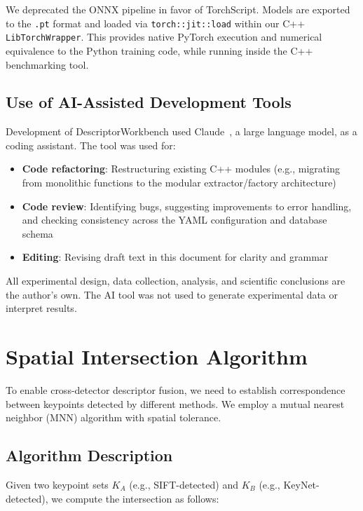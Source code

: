 We deprecated the ONNX pipeline in favor of TorchScript. Models are exported to the \texttt{.pt} format and loaded via \texttt{torch::jit::load} within our C++ \texttt{LibTorchWrapper}. This provides native PyTorch execution and numerical equivalence to the Python training code, while running inside the C++ benchmarking tool.

\subsection{Use of AI-Assisted Development Tools}

Development of DescriptorWorkbench used Claude~\cite{anthropic2025claude}, a large language model, as a coding assistant. The tool was used for:

\begin{itemize}
    \item \textbf{Code refactoring}: Restructuring existing C++ modules (e.g., migrating from monolithic functions to the modular extractor/factory architecture)
    \item \textbf{Code review}: Identifying bugs, suggesting improvements to error handling, and checking consistency across the YAML configuration and database schema
    \item \textbf{Editing}: Revising draft text in this document for clarity and grammar
\end{itemize}

All experimental design, data collection, analysis, and scientific conclusions are the author's own. The AI tool was not used to generate experimental data or interpret results.

\section{Spatial Intersection Algorithm}%
\label{sec:intersection_algorithm}

To enable cross-detector descriptor fusion, we need to establish correspondence between keypoints detected by different methods. We employ a mutual nearest neighbor (MNN) algorithm with spatial tolerance.

\subsection{Algorithm Description}

Given two keypoint sets $K_A$ (e.g., SIFT-detected) and $K_B$ (e.g., KeyNet-detected), we compute the intersection as follows:

